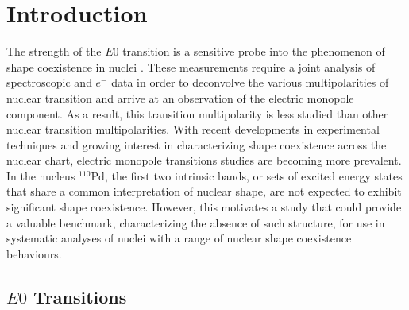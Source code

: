 
\chapter{Introduction}
\label{ch:Introduction}

The strength of the $E0$ transition is a sensitive probe into the phenomenon of shape coexistence in nuclei \cite{Wood1999}. These measurements require a joint analysis of spectroscopic \gr and $e^-$ data in order to deconvolve the various multipolarities of nuclear transition and arrive at an observation of the electric monopole component. As a result, this transition multipolarity is less studied than other nuclear transition multipolarities. With recent developments in experimental techniques and growing interest in characterizing shape coexistence across the nuclear chart, electric monopole transitions studies are becoming more prevalent. In the nucleus $^{110}\mathrm{Pd}$, the first two intrinsic bands, or sets of excited energy states that share a common interpretation of nuclear shape, are not expected to exhibit significant shape coexistence. However, this motivates a study that could provide a valuable benchmark, characterizing the absence of such structure, for use in systematic analyses of nuclei with a range of nuclear shape coexistence behaviours. 

\section{$E0$ Transitions}

